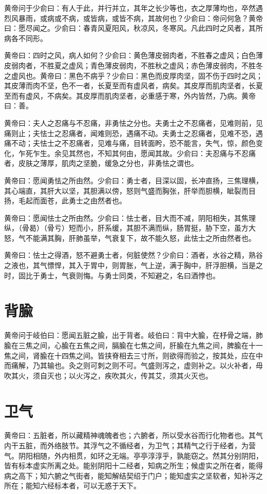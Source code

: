 \documentclass[a4paper,12pt,UTF8,twoside]{ctexbook}
\begin{document}
	黄帝问于少俞曰：有人于此，并行并立，其年之长少等也，衣之厚薄均也，卒然遇烈风暴雨，或病或不病，或皆病，或皆不病，其故何也？少俞曰：帝问何急？黄帝曰：愿尽闻之。少俞曰：春青风夏阳风，秋凉风，冬寒风。凡此四时之风者，其所病各不同形。
	
	黄帝曰：四时之风，病人如何？少俞曰：黄色薄皮弱肉者，不胜春之虚风；白色薄皮弱肉者，不胜夏之虚风；青色薄皮弱肉，不胜秋之虚风；赤色薄皮弱肉，不胜冬之虚风也。黄帝曰：黑色不病乎？少俞曰：黑色而皮厚肉坚，固不伤于四时之风；其皮薄而肉不坚，色不一者，长夏至而有虚风者，病矣。其皮厚而肌肉坚者，长夏至而有虚风，不病矣。其皮厚而肌肉坚者，必重感于寒，外内皆然，乃病。黄帝曰：善。
	
	黄帝曰：夫人之忍痛与不忍痛，非勇怯之分也。夫勇士之不忍痛者，见难则前，见痛则止；夫怯士之忍痛者，闻难则恐，遇痛不动。夫勇士之忍痛者，见难不恐，遇痛不动；夫怯士之不忍痛者，见难与痛，目转面盻，恐不能言，失气，惊，颜色变化，乍死乍生。余见其然也，不知其何由，愿闻其故。少俞曰：夫忍痛与不忍痛者，皮肤之薄厚，肌肉之坚脆，缓急之分也，非勇怯之谓也。
	
	黄帝曰：愿闻勇怯之所由然。少俞曰：勇士者，目深以固，长冲直扬，三焦理横，其心端直，其肝大以坚，其胆满以傍，怒则气盛而胸张，肝举而胆横，眦裂而目扬，毛起而面苍，此勇士之由然者也。
	
	黄帝曰：愿闻怯士之所由然。少俞曰：怯士者，目大而不减，阴阳相失，其焦理纵，（骨曷）（骨亏）短而小，肝系缓，其胆不满而纵，肠胃挺，胁下空，虽方大怒，气不能满其胸，肝肺虽举，气衰复下，故不能久怒，此怯士之所由然者也。
	
	黄帝曰：怯士之得酒，怒不避勇士者，何脏使然？少俞曰：酒者，水谷之精，熟谷之液也，其气慓悍，其入于胃中，则胃胀，气上逆，满于胸中，肝浮胆横，当是之时，固比于勇士，气衰则悔。与勇士同类，不知避之，名曰酒悖也。
	\chapter{背腧}
	
	黄帝问于岐伯曰：愿闻五脏之腧，出于背者。岐伯曰：背中大腧，在杼骨之端，肺腧在三焦之间，心腧在五焦之间，膈腧在七焦之间，肝腧在九焦之间，脾腧在十一焦之间，肾腧在十四焦之间。皆挟脊相去三寸所，则欲得而验之，按其处，应在中而痛解，乃其输也。灸之则可刺之则不可。气盛则泻之，虚则补之。以火补者，毋吹其火，须自灭也；以火泻之，疾吹其火，传其艾，须其火灭也。
	\chapter{卫气}
	
	黄帝曰：五脏者，所以藏精神魂魄者也；六腑者，所以受水谷而行化物者也。其气内干五脏，而外络肢节。其浮气之不循经者，为卫气；其精气之行于经者，为营气。阴阳相随，外内相贯，如环之无端。亭亭淳淳乎，孰能窃之。然其分别阴阳，皆有标本虚实所离之处。能别阴阳十二经者，知病之所生；候虚实之所在者，能得病之高下；知六腑之气街者，能知解结契绍于门户；能知虚实之坚软者，知补泻之所在；能知六经标本者，可以无惑于天下。
	
\end{document}
